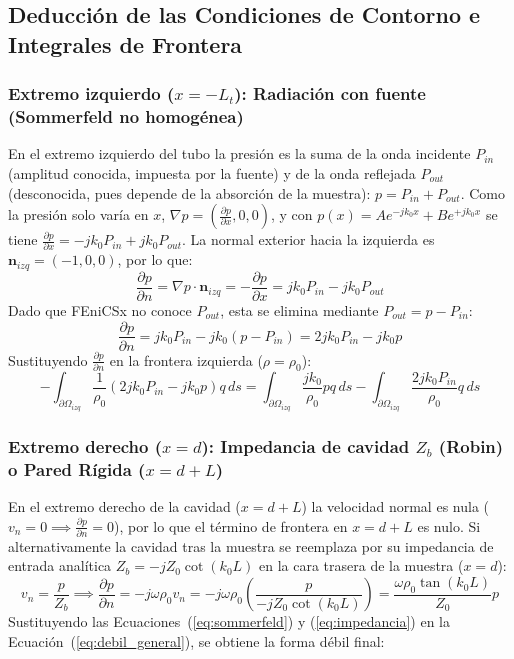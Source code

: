 \documentclass[11pt,a4paper]{article}
\begin{document}
\subsection{Deducción de las Condiciones de Contorno e Integrales de Frontera}
\subsubsection{Extremo izquierdo ($x = -L_t$): Radiación con fuente (Sommerfeld no homogénea)}
En el extremo izquierdo del tubo la presión es la suma de la onda incidente $P_{in}$ (amplitud conocida, impuesta por la fuente) y de la onda reflejada $P_{out}$ (desconocida, pues depende de la absorción de la muestra): $p = P_{in} + P_{out}$.
Como la presión solo varía en $x$, $\nabla p = \left(\frac{\partial p}{\partial x}, 0, 0\right)$, y con $p(x) = A e^{-j k_0 x} + B e^{+j k_0 x}$ se tiene $\frac{\partial p}{\partial x} = -j k_0 P_{in} + j k_0 P_{out}$. La normal exterior hacia la izquierda es $\mathbf{n}_{izq} = (-1, 0, 0)$, por lo que:
\begin{equation}
\frac{\partial p}{\partial n} = \nabla p \cdot \mathbf{n}_{izq} = -\frac{\partial p}{\partial x} = j k_0 P_{in} - j k_0 P_{out}
\end{equation}
Dado que FEniCSx no conoce $P_{out}$, esta se elimina mediante $P_{out} = p - P_{in}$:
\begin{equation}
\frac{\partial p}{\partial n} = j k_0 P_{in} - j k_0 (p - P_{in}) = 2 j k_0 P_{in} - j k_0 p
\label{eq:sommerfeld}
\end{equation}
Sustituyendo $\frac{\partial p}{\partial n}$ en la frontera izquierda ($\rho = \rho_0$):
\begin{equation}
-\int_{\partial\Omega_{izq}} \frac{1}{\rho_0} \left( 2 j k_0 P_{in} - j k_0 p \right) q \, ds = \int_{\partial\Omega_{izq}} \frac{j k_0}{\rho_0} p q \, ds - \int_{\partial\Omega_{izq}} \frac{2 j k_0 P_{in}}{\rho_0} q \, ds
\end{equation}

\subsubsection{Extremo derecho ($x = d$): Impedancia de cavidad $Z_b$ (Robin) o Pared Rígida ($x = d+L$)}
En el extremo derecho de la cavidad ($x=d+L$) la velocidad normal es nula ($v_n=0 \implies \frac{\partial p}{\partial n}=0$), por lo que el término de frontera en $x=d+L$ es nulo.
Si alternativamente la cavidad tras la muestra se reemplaza por su impedancia de entrada analítica $Z_b = -j Z_0 \cot(k_0 L)$ en la cara trasera de la muestra ($x=d$):
\begin{equation}
v_n = \frac{p}{Z_b} \implies \frac{\partial p}{\partial n} = -j \omega \rho_0 v_n = -j \omega \rho_0 \left( \frac{p}{-j Z_0 \cot(k_0 L)} \right) = \frac{\omega \rho_0 \tan(k_0 L)}{Z_0} p
\label{eq:impedancia}
\end{equation}
Sustituyendo las Ecuaciones~(\ref{eq:sommerfeld}) y (\ref{eq:impedancia}) en la Ecuación~(\ref{eq:debil_general}), se obtiene la forma débil final:
\end{document}
